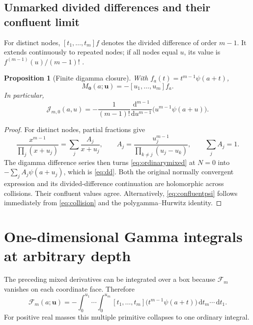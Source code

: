 \documentclass[11pt]{article}
\numberwithin{equation}{section}
\newtheorem{proposition}[theorem]{Proposition}
\theoremstyle{definition}\newtheorem{definition}[theorem]{Definition}
\theoremstyle{remark}\newtheorem{remark}[theorem]{Remark}
\newcommand{\dd}{\,\mathrm d}
\newcommand{\bu}{\boldsymbol{u}}
\newcommand{\cF}{\mathcal F}
\newcommand{\cJ}{\mathcal J}
\begin{document}
\subsection{Unmarked divided differences and their confluent limit}
For distinct nodes, $[t_1,\ldots,t_m]f$ denotes the divided difference of order $m-1$. It extends continuously to repeated nodes; if all nodes equal $u$, its value is $f^{(m-1)}(u)/(m-1)!$ \cite{deboor}.

\begin{proposition}[Finite digamma closure]\label{prop:dd}
With $f_a(t)=t^{m-1}\psi(a+t)$,
\begin{equation}\label{eq:dd}
 M_{\bm0}(a;\bu)=-[u_1,\ldots,u_m]f_a.
\end{equation}
In particular,
\begin{equation}\label{eq:confluentpsi}
 \cJ_{m,0}(a,u)
 =-\frac1{(m-1)!}\frac{\mathrm d^{m-1}}{\mathrm du^{m-1}}
       \bigl(u^{m-1}\psi(a+u)\bigr).
\end{equation}
\end{proposition}
\begin{proof}
For distinct nodes, partial fractions give
\[
 \frac{x^{m-1}}{\prod_j(x+u_j)}
 =\sum_j\frac{A_j}{x+u_j},\qquad
 A_j=\frac{u_j^{m-1}}{\prod_{k\ne j}(u_j-u_k)},\qquad \sum_jA_j=1.
\]
The digamma difference series then turns \eqref{eq:ordinarymixed} at $N=0$ into $-\sum_j A_j\psi(a+u_j)$, which is \eqref{eq:dd}. Both the original normally convergent expression and its divided-difference continuation are holomorphic across collisions. Their confluent values agree. Alternatively, \eqref{eq:confluentpsi} follows immediately from \eqref{eq:collision} and the polygamma--Hurwitz identity.
\end{proof}

\section{One-dimensional Gamma integrals at arbitrary depth}
The preceding mixed derivatives can be integrated over a box because $\cF_m$ vanishes on each coordinate face. Therefore
\begin{equation}\label{eq:box}
 \cF_m(a;\bu)
 =-\int_0^{u_1}\cdots\int_0^{u_m}
       [t_1,\ldots,t_m]\bigl(t^{m-1}\psi(a+t)\bigr)
       \dd t_m\cdots\dd t_1.
\end{equation}
For positive real masses this multiple primitive collapses to one ordinary integral.
\end{document}
